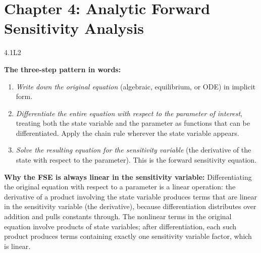 
\section{Chapter 4: Analytic Forward Sensitivity Analysis}

\begin{solution}{4.1}{L2}

\solanswer

\textbf{The three-step pattern in words:}

\begin{enumerate}
\item \textit{Write down the original equation} (algebraic, equilibrium,
      or ODE) in implicit form.
\item \textit{Differentiate the entire equation with respect to the
      parameter of interest}, treating both the state variable and
      the parameter as functions that can be differentiated.
      Apply the chain rule wherever the state variable appears.
\item \textit{Solve the resulting equation for the sensitivity variable}
      (the derivative of the state with respect to the parameter).
      This is the forward sensitivity equation.
\end{enumerate}

\textbf{Why the FSE is always linear in the sensitivity variable:}
Differentiating the original equation with respect to a parameter
is a linear operation: the derivative of a product involving the
state variable produces terms that are linear in the sensitivity
variable (the derivative), because differentiation distributes
over addition and pulls constants through. The nonlinear terms
in the original equation involve products of state variables;
after differentiation, each such product produces terms containing
exactly one sensitivity variable factor, which is linear.


\end{solution}

